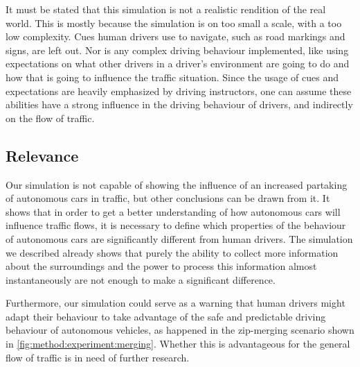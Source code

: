 It must be stated that this simulation is not a realistic rendition of the real world. This is mostly because the simulation is on too small a scale, with a too low complexity. Cues human drivers use to navigate, such as road markings and signs, are left out. Nor is any complex driving behaviour implemented, like using expectations on what other drivers in a driver's environment are going to do and how that is going to influence the traffic situation. Since the usage of cues and expectations are heavily emphasized by driving instructors, one can assume these abilities have a strong influence in the driving behaviour of drivers, and indirectly on the flow of traffic.

\subsection{Relevance}
\label{sub:conclusion:relevance}
Our simulation is not capable of showing the influence of an increased partaking of autonomous cars in traffic, but other conclusions can be drawn from it. It shows that in order to get a better understanding of how autonomous cars will influence traffic flows, it is necessary to define which properties of the behaviour of autonomous cars are significantly different from human drivers. The simulation we described already shows that purely the ability to collect more information about the surroundings and the power to process this information almost instantaneously are not enough to make a significant difference.

Furthermore, our simulation could serve as a warning that human drivers might adapt their behaviour to take advantage of the safe and predictable driving behaviour of autonomous vehicles, as happened in the zip-merging scenario shown in \cref{fig:method:experiment:merging}. Whether this is advantageous for the general flow of traffic is in need of further research.